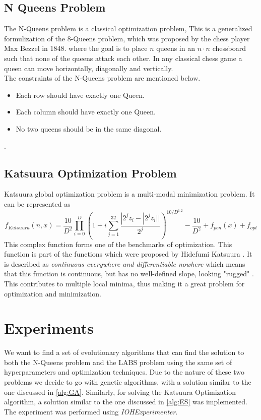 \documentclass{article}
\begin{document}
\subsection{N Queens Problem}\label{sec:nqueens}
The N-Queens problem is a classical optimization problem, This is a generalized formulization of the 8-Queens problem, which was proposed by the chess player Max Bezzel in 1848. where the goal is to place $n$ queens in an $n \cdot n$ chessboard such that none of the queens attack each other. In any classical chess game a queen can move horizontally, diagonally and vertically. \\ 
The constraints of the N-Queens problem are mentioned below.  \cite{n_queens}
\begin{itemize}
    \item Each row should have exactly one Queen. 
    \item Each column should have exactly one Queen.
    \item No two queens should be in the same diagonal.
\end{itemize}. 

\subsection{Katsuura Optimization Problem} \label{sec:katsuura}
Katsuura global optimization problem is a multi-modal minimization problem. It can be represented as \cite{katsuura-source}
\begin{equation*}
     f_{Katsuura}(n, x) = \frac{10}{D^2} \prod_{i=0}^{D} \left ( 1 + i \sum_{j=1}^{32} \frac{|2^jz_i- |2^j z_i||}{2^j} \right )^{10/D^{1.2}}-\frac{10}{D^2} + f_{pen}(x) + f_{opt}
\end{equation*}
This complex function forms one of the benchmarks of optimization. This function is part of the functions which were proposed by Hidefumi Katsuura \cite{katsuura-actualpaper}. It is described as \textit{continuous everywhere and differentiable nowhere} which means that this function is continuous, but has no well-defined slope, looking "rugged" \cite{rugged-boi}. This contributes to multiple local minima, thus making it a great problem for optimization and minimization. 

\section{Experiments} \label{sec:exp-results}
We want to find a set of evolutionary algorithms that can find the solution to both the N-Queens problem and the LABS problem using the same set of hyperparameters and optimization techniques. Due to the nature of these two problems we decide to go with genetic algorithms, with a solution similar to the one discussed in \ref{alg:GA}. Similarly, for solving the Katsuura Optimization algorithm, a solution similar to the one discussed in \ref{alg:ES} was implemented.   \\
The experiment was performed using \textit{IOHExperimenter}. \cite{IOHexperimenter}
\end{document}
